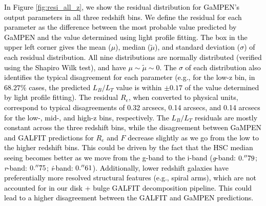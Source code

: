 \documentclass[linenumbers,twocolumn,twocolappendix]{aastex631}
\newcommand\gampen{GaMPEN}
\newcommand\gb{\textit{g}}
\newcommand\rb{\textit{r}}
\newcommand\ib{\textit{i}}
\begin{document}
\begin{CJK*}{UTF8}{gbsn}
\textcolor{black}{In Figure \ref{fig:resi_all_z}, we show the residual distribution for \gampen{}'s output parameters in all three redshift bins. We define the residual for each parameter as the difference between the most probable value predicted by \gampen{} and the value determined using light profile fitting. The box in the upper left corner gives 
the mean ($\mu$), median ($\tilde{\mu}$), and standard deviation ($\sigma$) of each residual distribution. All nine distributions are normally distributed (verified using the Shapiro Wilk test), and have $\mu \sim \tilde{\mu} \sim 0$. The $\sigma$ of each distribution also identifies the typical disagreement for each parameter (e.g., for the low-z bin, in $68.27\%$ cases, the predicted $L_B/L_T$ value is within $\pm0.17$ of the value determined by light profile fitting). The residual $R_e$, when converted to physical units, correspond to typical disagreements of 0.32 arcsecs, 0.14 arcsecs, and 0.14 arcsecs for the low-, mid-, and high-z bins, respectively. The $L_B/L_T$ residuals are mostly constant across the three redshift bins, while the disagreement between \gampen{} and GALFIT predictions for $R_e$ and $F$ decrease slightly as we go from the low to the higher redshift bins. This could be driven by the fact that the HSC median seeing becomes better as we move from the g-band to the i-band (\gb{}-band: $0.\mbox{$^{\prime\prime}$}79$; \rb{}-band: $0.\mbox{$^{\prime\prime}$}75$; \ib{}-band: $0.\mbox{$^{\prime\prime}$}61$). Additionally, lower redshift galaxies have preferentially more resolved structural features (e.g., spiral arms), which are not accounted for in our disk + bulge GALFIT decomposition pipeline. This could lead to a higher disagreement between the GALFIT and \gampen{} predictions.}  


\end{CJK*}
\end{document}
